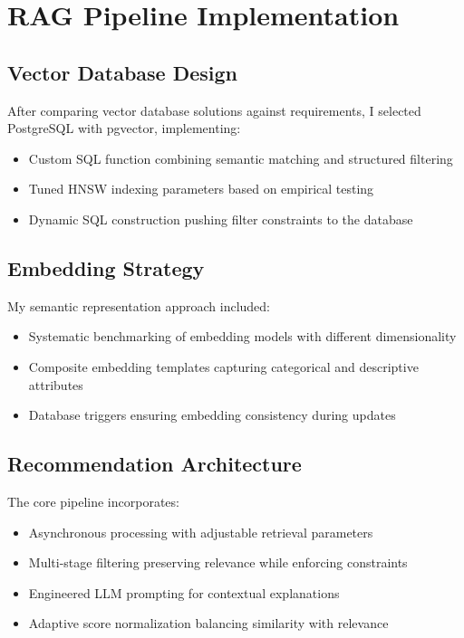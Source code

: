 \documentclass[9pt,a4paper,twocolumn]{article}
\begin{document}
\section{\fontsize{9}{11}\selectfont RAG Pipeline Implementation}
\fontsize{8}{10}\selectfont
\subsection{\fontsize{8.5}{10}\selectfont Vector Database Design}
After comparing vector database solutions against requirements, I selected PostgreSQL with pgvector, implementing:
\begin{itemize}
    \item Custom SQL function combining semantic matching and structured filtering
    \item Tuned HNSW indexing parameters based on empirical testing
    \item Dynamic SQL construction pushing filter constraints to the database
\end{itemize}

\subsection{\fontsize{8.5}{10}\selectfont Embedding Strategy}
My semantic representation approach included:
\begin{itemize}
    \item Systematic benchmarking of embedding models with different dimensionality
    \item Composite embedding templates capturing categorical and descriptive attributes
    \item Database triggers ensuring embedding consistency during updates
\end{itemize}

\subsection{\fontsize{8.5}{10}\selectfont Recommendation Architecture}
The core pipeline incorporates:
\begin{itemize}
    \item Asynchronous processing with adjustable retrieval parameters
    \item Multi-stage filtering preserving relevance while enforcing constraints
    \item Engineered LLM prompting for contextual explanations
    \item Adaptive score normalization balancing similarity with relevance
\end{itemize}
\end{document}
